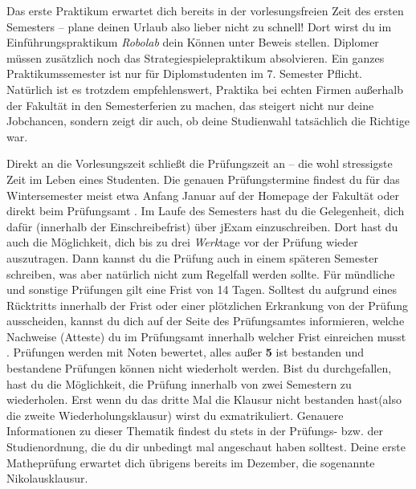 Das erste Praktikum erwartet dich bereits in der vorlesungsfreien Zeit des ersten Semesters – plane deinen Urlaub also lieber nicht zu schnell!
Dort wirst du im Einführungspraktikum \textit{Robolab} dein Können unter Beweis stellen. Diplomer müssen zusätzlich noch das Strategiespielepraktikum absolvieren.
Ein ganzes Praktikumssemester ist nur für Diplomstudenten im 7. Semester Pflicht.
Natürlich ist es trotzdem empfehlenswert, Praktika bei echten Firmen außerhalb der Fakultät in den Semesterferien zu machen, das steigert nicht nur deine Jobchancen,
sondern zeigt dir auch, ob deine Studienwahl tatsächlich die Richtige war.

\label{sec:pruefungen}
Direkt an die Vorlesungszeit schließt die Prüfungszeit an – die wohl stressigste Zeit im Leben eines Studenten.
Die genauen Prüfungstermine findest du für das Wintersemester meist etwa Anfang Januar auf der Homepage der Fakultät  oder direkt beim Prüfungsamt .
Im Laufe des Semesters hast du die Gelegenheit, dich dafür (innerhalb der Einschreibefrist) über jExam einzuschreiben.
Dort hast du auch die Möglichkeit, dich bis zu drei \emph{Werk}tage vor der Prüfung wieder auszutragen. Dann kannst du die Prüfung auch in einem späteren Semester schreiben, was aber natürlich
nicht zum Regelfall werden sollte. Für mündliche und sonstige Prüfungen gilt eine Frist von 14 Tagen.
Solltest du aufgrund eines Rücktritts innerhalb der Frist oder einer plötzlichen Erkrankung von der Prüfung ausscheiden, kannst du dich auf der Seite des Prüfungsamtes informieren,
welche Nachweise (Atteste) du im Prüfungsamt innerhalb welcher Frist einreichen musst .
Prüfungen werden mit Noten bewertet, alles außer \textbf{5} ist bestanden und bestandene Prüfungen können nicht wiederholt werden.
Bist du durchgefallen, hast du die Möglichkeit, die Prüfung innerhalb von zwei Semestern zu wiederholen. Erst wenn du das dritte Mal die Klausur nicht bestanden hast(also die zweite Wiederholungsklausur) wirst du exmatrikuliert.
Genauere Informationen zu dieser Thematik findest du stets in der Prüfungs- bzw. der Studienordnung, die du dir unbedingt mal angeschaut haben solltest.
Deine erste Matheprüfung erwartet dich übrigens bereits im Dezember, die sogenannte Nikolausklausur.

